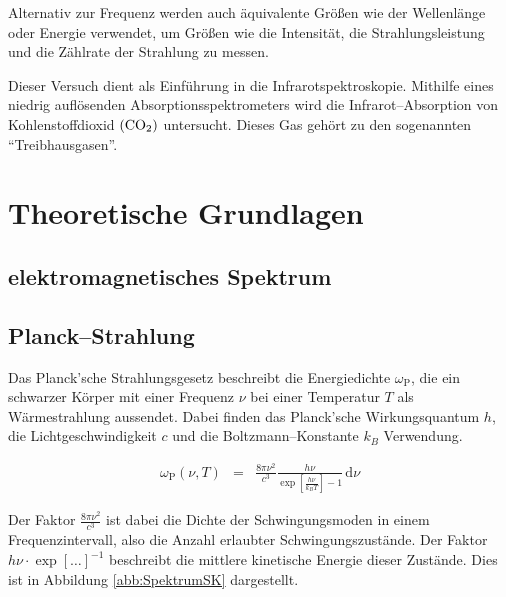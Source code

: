 \documentclass[12pt,a4paper]{scrartcl}
\numberwithin{equation}{section} %
\renewcommand{\[}{} %
\renewcommand{\]}{\noindent} %
\begin{document}
Alternativ zur Frequenz werden auch äquivalente Größen wie der
Wellenlänge oder Energie verwendet, um Größen wie die Intensität, die
Strahlungsleistung und die Zählrate der Strahlung zu messen.

Dieser Versuch dient als Einführung in die Infrarotspektroskopie.
Mithilfe eines niedrig auflösenden Absorptionsspektrometers wird die
Infrarot--Absorption von Kohlenstoffdioxid \((\ce{CO_2})\) untersucht.
Dieses Gas gehört zu den sogenannten ``Treibhausgasen''.

\clearpage
\hypertarget{theoretische-grundlagen}{%
\section{Theoretische Grundlagen}\label{theoretische-grundlagen}}

\hypertarget{elektromagnetisches-spektrum}{%
\subsection{elektromagnetisches
Spektrum}\label{elektromagnetisches-spektrum}}

\hypertarget{planckstrahlung}{%
\subsection{Planck--Strahlung}\label{planckstrahlung}}

Das Planck'sche Strahlungsgesetz beschreibt die Energiedichte \(\omega_\mathrm{P}\), die ein schwarzer Körper mit einer Frequenz \(\nu\) bei einer Temperatur \(T\) als Wärmestrahlung aussendet. Dabei finden das Planck'sche Wirkungsquantum \(h\), die Lichtgeschwindigkeit \(c\) und die Boltzmann--Konstante \(k_B\) Verwendung. \cite{Demtröder}

\[
\begin{eqnarray}
    \omega_\mathrm{P}(\nu,T) &=&
        \frac{8\pi\nu^2}{c^3}
        \frac{h\nu}{\exp\left[\frac{h\nu}{k_BT}\right]-1}
        \,\mathrm d\nu
        \label{eq:PlackStrahlung}
\end{eqnarray}
\]

\noindent
Der Faktor \(\frac{8\pi\nu^2}{c^3}\) ist dabei die Dichte der Schwingungsmoden in einem Frequenzintervall, also die Anzahl erlaubter
Schwingungszustände. Der Faktor \(h\nu\cdot\exp[\dots]^{-1}\) beschreibt die mittlere kinetische Energie dieser Zustände. Dies ist in Abbildung \ref{abb:SpektrumSK} dargestellt.
\end{document}
